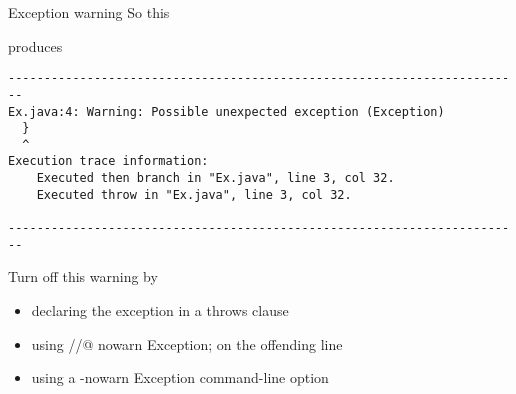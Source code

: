 \documentclass[
pdf,
nocolorBG,
slideColor,
cok,
]{prosper}
\begin{document}
\begin{slide}{Exception warning}
\vspace*{-12ex}
So this
\begin{figure*}
\tiny

\end{figure*}
produces
{\tiny
\begin{verbatim}
------------------------------------------------------------------------
Ex.java:4: Warning: Possible unexpected exception (Exception)
  }
  ^
Execution trace information:
    Executed then branch in "Ex.java", line 3, col 32.
    Executed throw in "Ex.java", line 3, col 32.

------------------------------------------------------------------------
\end{verbatim}
}
Turn off this warning by
\begin{itemize}
\item declaring the exception in a throws clause
\item using {\knalblue //@ nowarn Exception; } on the offending line
\item using a {\knalblue -nowarn Exception} command-line option
\end{itemize}
\end{slide}
\end{document}
